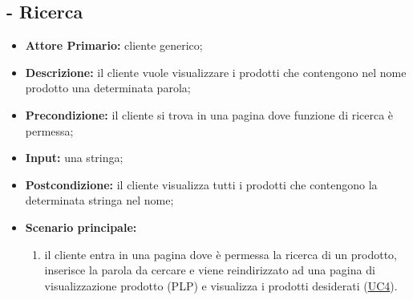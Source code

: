 \stepUserCase
\subsection{ - Ricerca}
\begin{itemize}
    \item \textbf{Attore Primario:} cliente generico;
    \item \textbf{Descrizione:} il cliente vuole visualizzare i prodotti che contengono nel nome prodotto una determinata parola;
    \item \textbf{Precondizione:} il cliente si trova in una pagina dove funzione di ricerca è permessa;
    \item \textbf{Input:} una stringa;
    \item \textbf{Postcondizione:} il cliente visualizza tutti i prodotti che contengono la determinata stringa nel nome;
    \item \textbf{Scenario principale:}
          \begin{enumerate}
              \item il cliente entra in una pagina dove è permessa la ricerca di un prodotto, inserisce la parola da cercare e viene reindirizzato ad una pagina di visualizzazione prodotto (PLP) e visualizza i prodotti desiderati (\hyperref[UC4]{UC4}).
          \end{enumerate}
\end{itemize}

\stepUserCase

